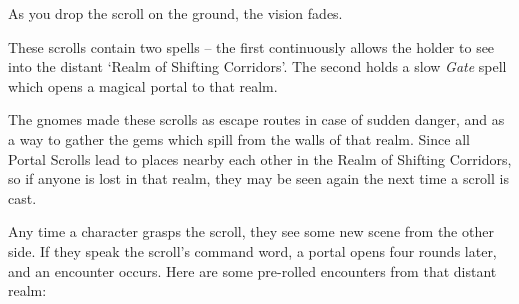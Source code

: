 \begin{multicols}{2}
\begin{boxtext}
  As you drop the scroll on the ground, the vision fades.

\end{boxtext}

These scrolls contain two spells -- the first continuously allows the holder to see into the distant `Realm of Shifting Corridors'.%
The second holds a slow \textit{Gate} spell
which opens a magical portal to that realm.

The gnomes made these scrolls as escape routes in case of sudden danger, and as a way to gather the gems which spill from the walls of that realm.
Since all Portal Scrolls lead to places nearby each other in the Realm of Shifting Corridors, so if anyone is lost in that realm, they may be seen again the next time a scroll is cast.

Any time a character grasps the scroll, they see some new scene from the other side.
If they speak the scroll's command word, a portal opens four rounds later, and an encounter occurs.
Here are some pre-rolled encounters from that distant realm:

\needspace{4em}
\begin{itemize}


\end{itemize}
\end{multicols}
